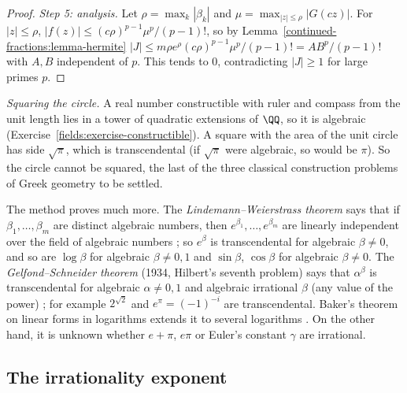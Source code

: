 \begin{proof}
\emph{Step 5: analysis.} Let $\rho = \max_k|\beta_k|$ and $\mu = \max_{|z| \leq \rho}|G(cz)|$. For $|z| \leq \rho$, $|f(z)| \leq (c\rho)^{p-1}\mu^p/(p - 1)!$, so by Lemma~\ref{continued-fractions:lemma-hermite}
$|J| \leq m\rho e^\rho(c\rho)^{p-1}\mu^p/(p - 1)! = AB^p/(p - 1)!$ with $A, B$ independent of $p$. This tends to $0$, contradicting $|J| \geq 1$ for large primes $p$.
\end{proof}

\begin{remark}\label{continued-fractions:remark-squaring-circle}
\emph{Squaring the circle.} A real number constructible with ruler and compass from the unit length lies in a tower of quadratic extensions of $\QQ$, so it is algebraic
(Exercise~\ref{fields:exercise-constructible}). A square with the area of the unit circle has side $\sqrt\pi$, which is transcendental (if $\sqrt\pi$ were algebraic, so would be $\pi$). So the
circle cannot be squared, the last of the three classical construction problems of Greek geometry to be settled.
\end{remark}

\begin{remark}\label{continued-fractions:remark-transcendence-theorems}
The method proves much more. The \emph{Lindemann--Weierstrass theorem} says that if $\beta_1, \ldots, \beta_m$ are distinct algebraic numbers, then $e^{\beta_1}, \ldots, e^{\beta_m}$ are linearly
independent over the field of algebraic numbers \cite[Chapter 1]{baker-transcendental}; so $e^\beta$ is transcendental for algebraic $\beta \neq 0$, and so are $\log\beta$ for algebraic
$\beta \neq 0, 1$ and $\sin\beta$, $\cos\beta$ for algebraic $\beta \neq 0$. The \emph{Gelfond--Schneider theorem} (1934, Hilbert's seventh problem) says that $\alpha^\beta$ is transcendental for
algebraic $\alpha \neq 0, 1$ and algebraic irrational $\beta$ (any value of the power) \cite{baker-transcendental}; for example $2^{\sqrt2}$ and $e^\pi = (-1)^{-i}$ are transcendental.
Baker's theorem on linear forms in logarithms extends it to several logarithms \cite{baker-transcendental}. On the other hand, it is unknown whether $e + \pi$, $e\pi$ or Euler's constant $\gamma$ are
irrational.
\end{remark}

\subsection{The irrationality exponent}\label{continued-fractions:subsection-exponent}

